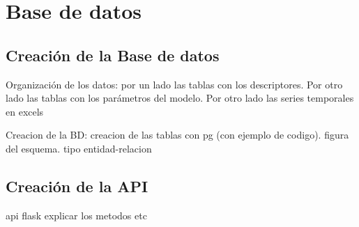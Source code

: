 \chapter{Base de datos}
\label{capitulo 3}

\section{Creación de la Base de datos}
Organización de los datos: por un lado las tablas con los descriptores.
Por otro lado las tablas con los parámetros del modelo.
Por otro lado las series temporales en excels

Creacion de la BD: creacion de las tablas con pg (con ejemplo de codigo). figura del esquema. tipo entidad-relacion

\section{Creación de la API}
api flask
explicar los metodos
etc